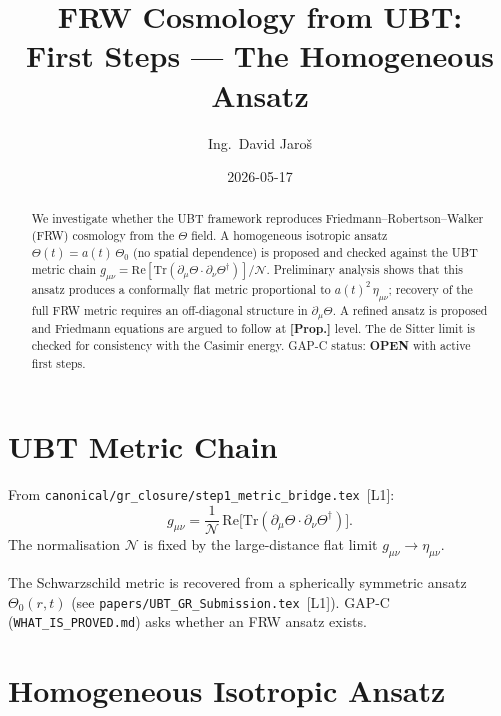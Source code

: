 \documentclass[12pt,a4paper]{article}
\title{FRW Cosmology from UBT:\\[4pt]
       First Steps — The Homogeneous Ansatz}
\author{Ing.\ David Jaro\v{s}}
\date{2026-05-17}
\begin{document}
\maketitle

\begin{abstract}
We investigate whether the UBT framework reproduces Friedmann--Robertson--Walker
(FRW) cosmology from the $\Theta$ field.  A homogeneous isotropic ansatz
$\Theta(t) = a(t)\,\Theta_0$ (no spatial dependence) is proposed and checked
against the UBT metric chain
$g_{\mu\nu} = \mathrm{Re}[\mathrm{Tr}(\partial_\mu\Theta\cdot\partial_\nu\Theta^\dagger)]/\mathcal{N}$.
Preliminary analysis shows that this ansatz produces a conformally flat metric
proportional to $a(t)^2\,\eta_{\mu\nu}$; recovery of the full FRW metric requires
an off-diagonal structure in $\partial_\mu\Theta$.  A refined ansatz is proposed
and Friedmann equations are argued to follow at \textbf{[Prop.]} level.
The de Sitter limit is checked for consistency with the Casimir energy.
GAP-C status: \textbf{OPEN} with active first steps.
\end{abstract}

\tableofcontents

\section{UBT Metric Chain}
\label{sec:metric_chain}

From \texttt{canonical/gr\_closure/step1\_metric\_bridge.tex}~[L1]:
\begin{equation}
  \label{eq:metric_chain}
  g_{\mu\nu} = \frac{1}{\mathcal{N}}\,
  \mathrm{Re}\bigl[\mathrm{Tr}(\partial_\mu\Theta\cdot\partial_\nu\Theta^\dagger)\bigr].
\end{equation}
The normalisation $\mathcal{N}$ is fixed by the large-distance flat limit
$g_{\mu\nu} \to \eta_{\mu\nu}$.

The Schwarzschild metric is recovered from a spherically symmetric ansatz
$\Theta_0(r,t)$ (see \texttt{papers/UBT\_GR\_Submission.tex}~[L1]).
GAP-C (\texttt{WHAT\_IS\_PROVED.md}) asks whether an FRW ansatz exists.

\section{Homogeneous Isotropic Ansatz}
\label{sec:frw_ansatz}
\end{document}
